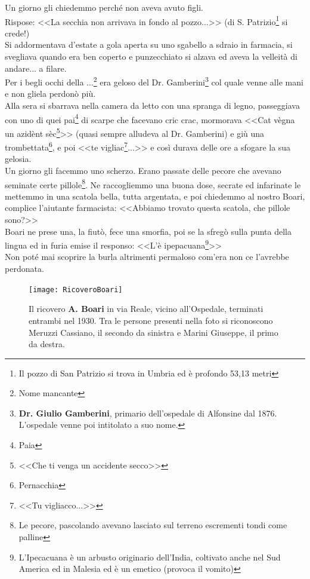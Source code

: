 Un giorno gli chiedemmo perché non aveva avuto figli.\\
\indent Rispose: <<La secchia non arrivava in fondo al pozzo...>> (di S. Patrizio\footnote{Il pozzo di San Patrizio si trova in Umbria ed è profondo 53,13 metri} si crede!)\\
\indent Si addormentava d'estate a gola aperta su uno sgabello a sdraio in farmacia, si svegliava quando era ben coperto e punzecchiato si alzava ed aveva la velleità di andare... a filare. \\
\indent Per i begli occhi della .\:.\:.\footnote{Nome mancante} era geloso del Dr. Gamberini\footnote{\textbf{Dr. Giulio Gamberini}, primario dell'ospedale di Alfonsine dal 1876. L'ospedale venne poi intitolato a suo nome.} col quale venne alle mani e non gliela perdonò più. \\
\indent Alla sera si sbarrava nella camera da letto con una spranga di legno, passeggiava con uno di quei pai\footnote{Paia} di scarpe che facevano cric crac, mormorava <<Cat vègna un azidènt sèc\footnote{<<Che ti venga un accidente secco>>}>> (quasi sempre alludeva al Dr. Gamberini) e giù una trombettata\footnote{Pernacchia}, e poi <<te vigliac\footnote{<<Tu vigliacco...>>}...>> e così durava delle ore a sfogare la sua gelosia.\\

\indent Un giorno gli facemmo uno scherzo. Erano passate delle pecore che avevano seminate certe pillole\footnote{Le pecore, pascolando avevano lasciato sul terreno escrementi tondi come palline}. Ne raccogliemmo una buona dose, secrate ed infarinate le mettemmo in una scatola bella, tutta argentata, e poi chiedemmo al nostro Boari, complice l'aiutante farmacista: <<Abbiamo trovato questa scatola, che pillole sono?>>\\
\indent Boari ne prese una, la fiutò, fece una smorfia, poi se la sfregò sulla punta della lingua ed in furia emise il responso: <<L'è ipepacuana\footnote{L'Ipecacuana è un arbusto originario dell'India, coltivato anche nel Sud America ed in Malesia ed è un emetico (provoca il vomito) }>>\\
\indent Non poté mai scoprire la burla altrimenti permaloso com'era non ce l'avrebbe perdonata.

 \begin{figure}[htb]
    \centering
    \texttt{[image: RicoveroBoari]}
    \caption*{Il ricovero \textbf{A. Boari} in via Reale, vicino all'Ospedale, terminati entrambi nel 1930. Tra le persone presenti nella foto si riconoscono  Meruzzi Cassiano, il secondo da sinistra e Marini Giuseppe, il primo da destra.\label{fig:RicoveroBoari}}
\end{figure}

